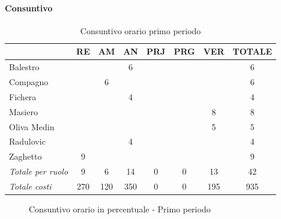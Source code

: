 \documentclass[a4paper,12pt]{article}
\begin{document}
            \paragraph{Consuntivo}
                \begin{table}[H]
                \centering
                \caption{Consuntivo orario primo periodo}
                \begin{tabular}{|l|c|c|c|c|c|c|c|}
                \hline
                    \rowcolor{lightgray}{\textbf{Membro}} & {\textbf{RE}} & {\textbf{AM}} & {\textbf{AN}} & {\textbf{PRJ}} & {\textbf{PRG}} & {\textbf{VER}} & {\textbf{TOTALE}}\\
                \hline
                    Balestro & & & 6 & & & & 6\\
                \hline
                    Compagno & & 6 & & & & & 6\\
                \hline
                    Fichera & & & 4 & & & & 4\\
                \hline
                    Masiero & & & & & & 8 & 8\\
                \hline
                    Oliva Medin & & & & & & 5 & 5\\
                \hline
                    Radulovic & & & 4 & & & & 4\\
                \hline
                    Zaghetto & 9 & & & & & & 9\\
                \hline
                    \rowcolor{lightgray}\textit{Totale per ruolo} & 9 & 6 & 14 & 0 & 0 & 13 & 42\\
                \hline
                    \rowcolor{lightgray}\textit{Totale costi} & 270 & 120 & 350 & 0 & 0 & 195 & 935\\
                \hline
                \end{tabular}
                \end{table}

                \begin{figure}[H]
                \centering
                \caption{Consuntivo orario in percentuale - Primo periodo}
                \end{figure}
                
\end{document}
